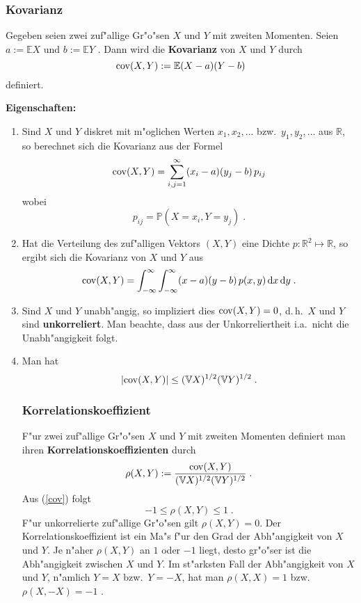 \documentclass[ngerman,draft,parskip=half,twoside]{scrartcl}
\newcommand*{\R}{\mathbb{R}}      %
\newcommand*{\E}{\mathbb{E}}        %
\newcommand*{\V}{\mathbb{V}}        %
\newcommand*{\WKM}{\mathbb{P}}      %
\begin{document}
\subsubsection{Kovarianz}
Gegeben seien zwei zuf"allige Gr"o"sen $X$ und $Y$ mit zweiten Momenten.
Seien $a:=\E X$ und $b:=\E Y$ . Dann wird die \textbf{Kovarianz} von $X$ und $Y$ durch
$$
{\rm  cov}(X,Y):= \E(X-a)(Y-b)
$$
definiert.

\textbf{Eigenschaften:}

\begin{enumerate}
\item
Sind $X$ und $Y$ diskret mit m"oglichen Werten $x_1,x_2,\ldots$ bzw.~$y_1,y_2,\ldots$ aus $\R$,
so berechnet sich die Kovarianz aus der Formel
$$
{\rm  cov}(X,Y)=\sum_{i,j=1}^\infty (x_i-a)(y_j-b)\, p_{ij}
$$
wobei
$$
p_{ij}=\WKM(X=x_i, Y=y_j)\;.
$$
\item
Hat die Verteilung des zuf"alligen Vektors $(X,Y)$ eine Dichte $p \colon\R^2\mapsto\R$, so
ergibt sich die Kovarianz von $X$ und $Y$ aus
$$
{\rm  cov}(X,Y)=\int_{-\infty}^\infty \int_{-\infty}^\infty (x-a)(y-b)\,p(x,y)\,\mathrm d x\, \mathrm d y\;.
$$
\item
Sind $X$ und $Y$ unabh"angig, so impliziert dies ${\rm  cov}(X,Y)=0$, d.\,h.~$X$ und $Y$ sind
\textbf{unkorreliert}. Man beachte, dass aus der Unkorreliertheit i.a.~nicht die Unabh"angigkeit folgt.
\item
Man hat
\begin{equation}
\label{cov}
|{\rm  cov}(X,Y)|\le (\V X)^{1/2}(\V Y)^{1/2}\;.
\end{equation}
\subsubsection{Korrelationskoeffizient}
F"ur zwei zuf"allige Gr"o"sen $X$ und $Y$ mit zweiten Momenten definiert man ihren
\textbf{Korrelationskoeffizienten} durch
$$
\rho(X,Y):=\frac{{\rm  cov}(X,Y)}{(\V X)^{1/2}(\V Y)^{1/2}}\;.
$$
Aus (\ref{cov}) folgt
$$
-1\le \rho(X,Y)\le 1\;.
$$
F"ur unkorrelierte zuf"allige Gr"o"sen gilt $\rho(X,Y)=0$.
 Der Korrelationskoeffizient ist ein Ma"s f"ur den Grad der Abh"angigkeit von
$X$ und $Y$. Je n"aher $\rho(X,Y)$ an $1$ oder $-1$ liegt, desto gr"o"ser ist die
Abh"angigkeit zwischen $X$ und $Y$. Im st"arksten Fall
der Abh"angigkeit von $X$ und $Y$, n"amlich $Y=X$ bzw.~$Y=-X$, hat man $\rho(X,X)=1$ bzw.~$\rho(X,-X)=-1$ .
\end{enumerate}
\end{document}

